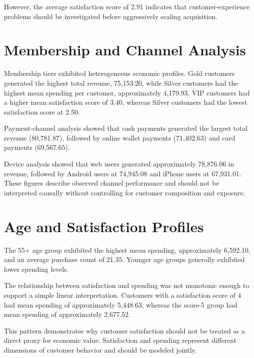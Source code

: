 \documentclass[11pt,a4paper]{article}
\begin{document}
However, the average satisfaction score of 2.91 indicates that customer-experience problems should be investigated before aggressively scaling acquisition.


\section{Membership and Channel Analysis}

Membership tiers exhibited heterogeneous economic profiles. Gold
customers generated the highest total revenue, 75,153.20, while Silver
customers had the highest mean spending per customer, approximately
4,179.93. VIP customers had a higher mean satisfaction score of 3.40,
whereas Silver customers had the lowest satisfaction score at 2.50.

Payment-channel analysis showed that cash payments generated the largest
total revenue (80,781.87), followed by online wallet payments (71,402.63)
and card payments (69,567.65).

Device analysis showed that web users generated approximately 78,876.06
in revenue, followed by Android users at 74,945.08 and iPhone users at
67,931.01. These figures describe observed channel performance and should
not be interpreted causally without controlling for customer composition
and exposure.


\section{Age and Satisfaction Profiles}

The 55+ age group exhibited the highest mean spending, approximately
6,592.10, and an average purchase count of 21.35. Younger age groups
generally exhibited lower spending levels.

The relationship between satisfaction and spending was not monotonic
enough to support a simple linear interpretation. Customers with a
satisfaction score of 4 had mean spending of approximately 5,448.63,
whereas the score-5 group had mean spending of approximately 2,677.52.

This pattern demonstrates why customer satisfaction should not be treated
as a direct proxy for economic value. Satisfaction and spending represent
different dimensions of customer behavior and should be modeled jointly.
\end{document}
